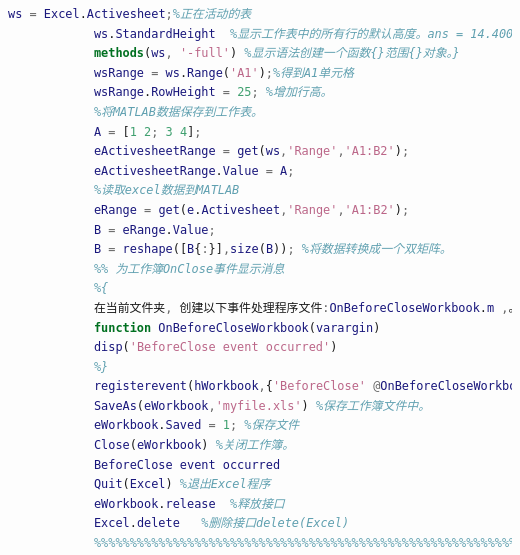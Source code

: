             \begin{lstlisting}[language=Matlab]
            ws = Excel.Activesheet;%正在活动的表
            ws.StandardHeight  %显示工作表中的所有行的默认高度。ans = 14.4000
            methods(ws, '-full') %显示语法创建一个函数{}范围{}对象。}
            wsRange = ws.Range('A1');%得到A1单元格
            wsRange.RowHeight = 25; %增加行高。
            %将MATLAB数据保存到工作表。
            A = [1 2; 3 4];
            eActivesheetRange = get(ws,'Range','A1:B2');
            eActivesheetRange.Value = A;
            %读取excel数据到MATLAB
            eRange = get(e.Activesheet,'Range','A1:B2');
            B = eRange.Value;
            B = reshape([B{:}],size(B)); %将数据转换成一个双矩阵。
            %% 为工作簿OnClose事件显示消息
            %{
            在当前文件夹, 创建以下事件处理程序文件:OnBeforeCloseWorkbook.m ,。
            function OnBeforeCloseWorkbook(varargin)
            disp('BeforeClose event occurred')
            %}
            registerevent(hWorkbook,{'BeforeClose' @OnBeforeCloseWorkbook})%注册函数为 OnClose 事件。
            SaveAs(eWorkbook,'myfile.xls') %保存工作簿文件中。
            eWorkbook.Saved = 1; %保存文件
            Close(eWorkbook) %关闭工作簿。
            BeforeClose event occurred
            Quit(Excel) %退出Excel程序
            eWorkbook.release  %释放接口
            Excel.delete   %删除接口delete(Excel)
            %%%%%%%%%%%%%%%%%%%%%%%%%%%%%%%%%%%%%%%%%%%%%%%%%%%%%%%%%%%%%%%%%%%
            \end{lstlisting}

